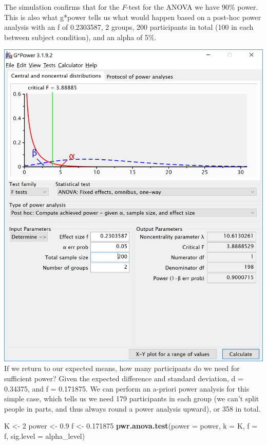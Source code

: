 \documentclass[]{book}
\newenvironment{Shaded}{\begin{snugshade}}{\end{snugshade}}
\newcommand{\DataTypeTok}[1]{\textcolor[rgb]{0.13,0.29,0.53}{#1}}
\newcommand{\DecValTok}[1]{\textcolor[rgb]{0.00,0.00,0.81}{#1}}
\newcommand{\FloatTok}[1]{\textcolor[rgb]{0.00,0.00,0.81}{#1}}
\newcommand{\KeywordTok}[1]{\textcolor[rgb]{0.13,0.29,0.53}{\textbf{#1}}}
\newcommand{\NormalTok}[1]{#1}
\newcommand{\StringTok}[1]{\textcolor[rgb]{0.31,0.60,0.02}{#1}}
\begin{document}
The simulation confirms that for the \emph{F}-test for the ANOVA we have 90\% power. This is also what g*power tells us what would happen based on a post-hoc power analysis with an f of 0.2303587, 2 groups, 200 participants in total (100 in each between subject condition), and an alpha of 5\%.

\includegraphics{screenshots/gpower_8.png}
If we return to our expected means, how many participants do we need for sufficient power? Given the expected difference and standard deviation, d = 0.34375, and f = 0.171875. We can perform an a-priori power analysis for this simple case, which tells us we need 179 participants in each group (we can't split people in parts, and thus always round a power analysis upward), or 358 in total.

\begin{Shaded}
\begin{Highlighting}[]
\NormalTok{K <-}\StringTok{ }\DecValTok{2}
\NormalTok{power <-}\StringTok{ }\FloatTok{0.9}
\NormalTok{f <-}\StringTok{ }\FloatTok{0.171875}
\KeywordTok{pwr.anova.test}\NormalTok{(}\DataTypeTok{power =}\NormalTok{ power,}
               \DataTypeTok{k =}\NormalTok{ K,}
               \DataTypeTok{f =}\NormalTok{ f,}
               \DataTypeTok{sig.level =}\NormalTok{ alpha_level)}
\end{Highlighting}
\end{Shaded}
\end{document}
